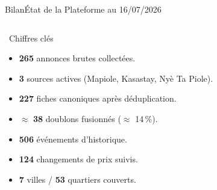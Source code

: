 \begin{frame}{Bilan}{État de la Plateforme au 16/07/2026}
  \begin{columns}[T]
      \begin{block}{\faDatabase\ Chiffres clés}
        \begin{itemize}
          \setlength{\itemsep}{4pt}
          \item \textbf{265} annonces brutes collectées.
          \item \textbf{3} sources actives (Mapiole, Kasastay, Nyè Ta Piole).
          \item \textbf{227} fiches canoniques après déduplication.
          \item $\approx$ \textbf{38} doublons fusionnés ($\approx$ 14\,\%).
          \item \textbf{506} événements d'historique.
          \item \textbf{124} changements de prix suivis.
          \item \textbf{7} villes / \textbf{53} quartiers couverts.
        \end{itemize}
      \end{block}


\end{columns}
\end{frame}
